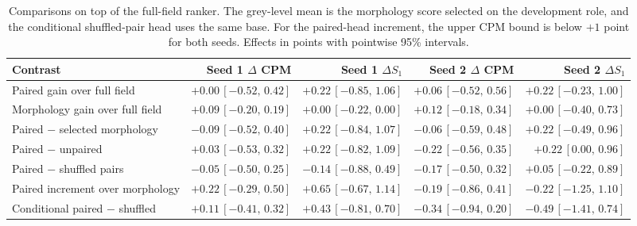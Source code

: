 \begin{table}[!t]
\centering
\footnotesize\setlength{\tabcolsep}{4pt}
\caption{Comparisons on top of the full-field ranker. The grey-level mean is the morphology score selected on the development role, and the conditional shuffled-pair head uses the same base. For the paired-head increment, the upper CPM bound is below $+1$ point for both seeds. Effects in points with pointwise 95\% intervals.}
\label{tab:locked_practical}
\begin{tabular}{@{}lrrrr@{}}
\toprule
Contrast & Seed 1 $\Delta$ CPM & Seed 1 $\Delta S_1$ & Seed 2 $\Delta$ CPM & Seed 2 $\Delta S_1$ \\
\midrule
Paired gain over full field & $+0.00\,[-0.52,\,0.42]$ & $+0.22\,[-0.85,\,1.06]$ & $+0.06\,[-0.52,\,0.56]$ & $+0.22\,[-0.23,\,1.00]$ \\
Morphology gain over full field & $+0.09\,[-0.20,\,0.19]$ & $+0.00\,[-0.22,\,0.00]$ & $+0.12\,[-0.18,\,0.34]$ & $+0.00\,[-0.40,\,0.73]$ \\
Paired $-$ selected morphology & $-0.09\,[-0.52,\,0.40]$ & $+0.22\,[-0.84,\,1.07]$ & $-0.06\,[-0.59,\,0.48]$ & $+0.22\,[-0.49,\,0.96]$ \\
Paired $-$ unpaired & $+0.03\,[-0.53,\,0.32]$ & $+0.22\,[-0.82,\,1.09]$ & $-0.22\,[-0.56,\,0.35]$ & $+0.22\,[0.00,\,0.96]$ \\
Paired $-$ shuffled pairs & $-0.05\,[-0.50,\,0.25]$ & $-0.14\,[-0.88,\,0.49]$ & $-0.17\,[-0.50,\,0.32]$ & $+0.05\,[-0.22,\,0.89]$ \\
Paired increment over morphology & $+0.22\,[-0.29,\,0.50]$ & $+0.65\,[-0.67,\,1.14]$ & $-0.19\,[-0.86,\,0.41]$ & $-0.22\,[-1.25,\,1.10]$ \\
Conditional paired $-$ shuffled & $+0.11\,[-0.41,\,0.32]$ & $+0.43\,[-0.81,\,0.70]$ & $-0.34\,[-0.94,\,0.20]$ & $-0.49\,[-1.41,\,0.74]$ \\
\bottomrule
\end{tabular}
\end{table}
